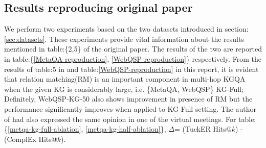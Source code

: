 \subsection{Results reproducing original paper}\label{sec: reproduction_results}
We perform two experiments based on the two datasets introduced in section:\ref{sec:datasets}. These experiments provide vital information about the results mentioned in table:\{2,5\} of the original paper. The results of the two are reported in table:\{\ref{MetaQA-reproduction}, \ref{WebQSP-reproduction}\} respectively. From the results of table:5 in \cite{saxena-etal-2020-improving} and table:\ref{WebQSP-reproduction} in this report, it is evident that relation matching(RM) is an important component in multi-hop KGQA when the given KG is considerably large, i.e. \{MetaQA, WebQSP\} KG-Full; Definitely, WebQSP-KG-50 also shows improvement in presence of RM but the performance significantly improves when applied to KG-Full setting. The author of \cite{saxena-etal-2020-improving} had also expressed the same opinion in one of the virtual meetings. For table:\{\ref{metqa-kg-full-ablation}, \ref{metqa-kg-half-ablation}\}, $\Delta$= (TuckER Hits@$k$) - (ComplEx Hits@$k$).

